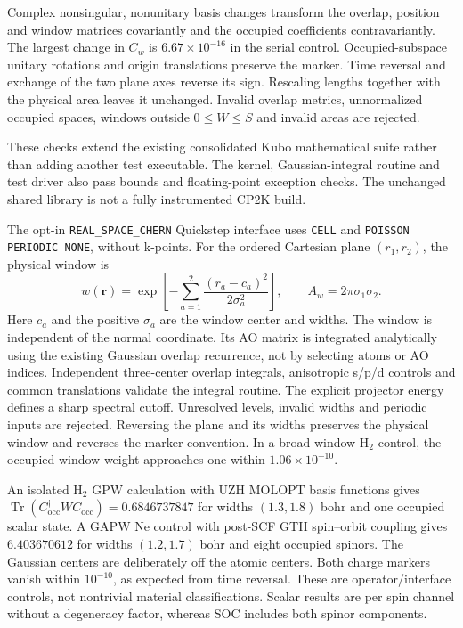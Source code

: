 \documentclass[11pt]{article}
\begin{document}
Complex nonsingular, nonunitary basis changes transform the overlap,
position and window matrices covariantly and the occupied
coefficients contravariantly. The largest change in $C_w$ is
$6.67\times10^{-16}$ in the serial control. Occupied-subspace
unitary rotations and origin translations preserve the marker.
Time reversal and exchange of the two plane axes reverse its sign.
Rescaling lengths together with the physical area leaves it
unchanged. Invalid overlap metrics, unnormalized occupied spaces,
windows outside $0\leq W\leq S$ and invalid areas are rejected.

These checks extend the existing consolidated Kubo mathematical
suite rather than adding another test executable. The kernel,
Gaussian-integral routine and test driver also pass bounds and
floating-point exception checks. The unchanged shared library is
not a fully instrumented CP2K build.

The opt-in \texttt{REAL\_SPACE\_CHERN} Quickstep interface uses
\texttt{CELL} and \texttt{POISSON PERIODIC NONE}, without k-points.
For the ordered Cartesian plane $(r_1,r_2)$, the physical window is
\begin{equation}
 w(\mathbf r)=\exp\!\left[-\sum_{a=1}^2
       \frac{(r_a-c_a)^2}{2\sigma_a^2}\right],\qquad
 A_w=2\pi\sigma_1\sigma_2.
\end{equation}
Here $c_a$ and the positive $\sigma_a$ are the window center and
widths. The window is independent of the normal coordinate.
Its AO matrix is integrated analytically using the existing
Gaussian overlap recurrence, not by selecting atoms or AO indices.
Independent three-center overlap integrals, anisotropic s/p/d
controls and common translations validate the integral routine.
The explicit projector energy defines a sharp spectral cutoff.
Unresolved levels, invalid widths and periodic inputs are rejected.
Reversing the plane and its widths preserves the physical window
and reverses the marker convention. In a broad-window H$_2$ control,
the occupied window weight approaches one within $1.06\times10^{-10}$.

An isolated H$_2$ GPW calculation with UZH MOLOPT basis functions
gives $\operatorname{Tr}(C_{\mathrm{occ}}^\dagger W C_{\mathrm{occ}})
=0.6846737847$ for widths $(1.3,1.8)$ bohr and one occupied scalar
state. A GAPW Ne control with post-SCF GTH spin--orbit coupling gives
$6.403670612$ for widths $(1.2,1.7)$ bohr and eight occupied spinors.
The Gaussian centers are deliberately off the atomic centers.
Both charge markers vanish within $10^{-10}$, as expected from time
reversal. These are operator/interface controls, not nontrivial
material classifications. Scalar results are per spin channel
without a degeneracy factor, whereas SOC includes both spinor
components.
\end{document}
